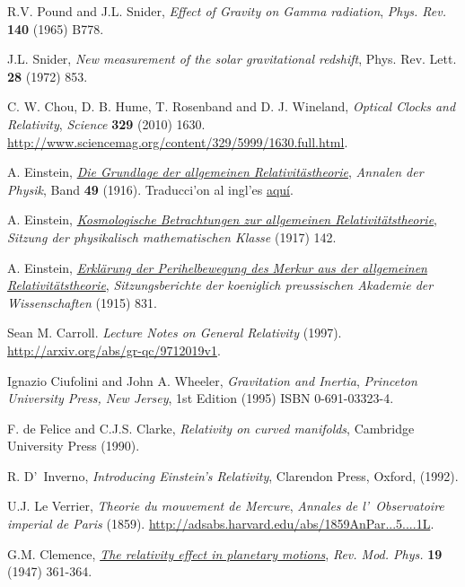 \begin{thebibliography}{99}
 R.V. Pound and J.L. Snider, {\em Effect of Gravity on Gamma radiation}, {\sl Phys. Rev.} {\bf 140} (1965) B778.

 J.L. Snider, {\em New measurement of the solar gravitational redshift}, {\rm Phys. Rev. Lett.} {\bf 28} (1972) 853.

 C. W. Chou, D. B. Hume, T. Rosenband and D. J. Wineland, {\em Optical Clocks and Relativity}, {\sl Science} {\bf 329} (2010) 1630. \url{http://www.sciencemag.org/content/329/5999/1630.full.html}.

 A. Einstein, \href{https://docs.google.com/open?id=0B4RSIcYW5V0HMWY1YzM2MjAtMmJhMy00NmQ5LWFhMjEtNjdlODhhNjcxZTFk}{\it Die Grundlage der allgemeinen Relativitästheorie}, {\sl Annalen der Physik}, Band {\bf 49} (1916). Traducci'on al ingl'es \href{http://goo.gl/E2YFn}{aqu\'i}.

 A. Einstein, \href{https://goo.gl/A8miy}{\it Kosmologische Betrachtungen zur allgemeinen Relativitätstheorie}, {\sl Sitzung der physikalisch mathematischen Klasse} (1917) 142.

 A. Einstein, \href{https://docs.google.com/open?id=0B4RSIcYW5V0Hd0haajhUS0tRems}{\it Erkl\"arung der Perihelbewegung des Merkur aus der allgemeinen Relativit\"atstheorie}, {\sl Sitzungsberichte der koeniglich preussischen Akademie der Wissenschaften} (1915) 831.



 Sean M. Carroll. {\it Lecture Notes on General Relativity} (1997). \url{http://arxiv.org/abs/gr-qc/9712019v1}.

 Ignazio Ciufolini and John A. Wheeler, {\it Gravitation and Inertia},
{\sl Princeton University Press, New Jersey}, 1st Edition (1995) ISBN 0-691-03323-4.

 F. de Felice and C.J.S. Clarke, {\em Relativity on curved manifolds}, Cambridge University Press (1990).

 R. D'~Inverno, {\em Introducing Einstein's Relativity}, Clarendon Press, Oxford, (1992).




 U.J. Le Verrier, {\em Theorie du mouvement de Mercure}, {\sl Annales de l'\ Observatoire imperial de Paris}  (1859). \url{http://adsabs.harvard.edu/abs/1859AnPar...5....1L}.

 G.M. Clemence, \href{http://rmp.aps.org/abstract/RMP/v19/i4/p361_1}{\it The relativity effect in planetary motions}, {\sl Rev. Mod. Phys.} {\bf 19} (1947) 361-364.


\end{thebibliography}
